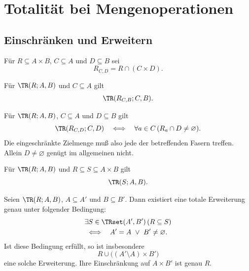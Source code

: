 \chapter{Totalität bei Mengenoperationen}
\label{b04guide:ch:sets}

\section{Einschränken und Erweitern}

\begin{definition}
Für $R\subseteq A\times B$, $C\subseteq A$ und $D\subseteq B$ sei
\[
 R_{C,D}=R\cap(C\times D).
\]

\end{definition}

\begin{theorem}
\label{b04guide:thm:restrict}
Für $\TR(R;A,B)$ und $C\subseteq A$ gilt
\[
 \TR(R_{C,B};C,B).
\]

\end{theorem}

\begin{theorem}
\label{b04guide:thm:target}
Für $\TR(R;A,B)$, $C\subseteq A$ und $D\subseteq B$ gilt
\[
 \TR(R_{C,D};C,D)
 \quad\Longleftrightarrow\quad
 \forall a\in C\,(R_a\cap D\ne\varnothing).
\]
Die eingeschränkte Zielmenge muß also jede der betreffenden
Fasern treffen. Allein $D\ne\varnothing$ genügt im allgemeinen nicht.
\end{theorem}

\begin{theorem}\label{b04guide:thm:upward}
Für $\TR(R;A,B)$ und $R\subseteq S\subseteq A\times B$ gilt
\[
 \TR(S;A,B).
\]

\end{theorem}

\begin{theorem}
\label{b04guide:thm:extend}
Seien $\TR(R;A,B)$, $A\subseteq A'$ und $B\subseteq B'$.
Dann existiert eine totale Erweiterung genau unter folgender Bedingung:
\[
 \begin{gathered}
 \exists S\in\TRset(A',B')\,(R\subseteq S)\\
 \Longleftrightarrow\quad A'=A\ \lor\ B'\ne\varnothing.
 \end{gathered}
\]
Ist diese Bedingung erfüllt, so ist insbesondere
\[
 R\cup\bigl((A'\setminus A)\times B'\bigr)
\]
eine solche Erweiterung. Ihre Einschränkung auf $A\times B'$ ist
genau $R$.
\end{theorem}

